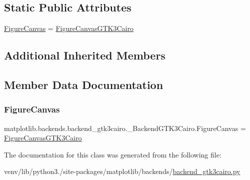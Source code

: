 \subsection*{Static Public Attributes}
\begin{DoxyCompactItemize}
\item 
\hyperlink{classmatplotlib_1_1backends_1_1backend__gtk3cairo_1_1__BackendGTK3Cairo_a6973d0943dc3c24234ed995259be9082}{Figure\+Canvas} = \hyperlink{classmatplotlib_1_1backends_1_1backend__gtk3cairo_1_1FigureCanvasGTK3Cairo}{Figure\+Canvas\+G\+T\+K3\+Cairo}
\end{DoxyCompactItemize}
\subsection*{Additional Inherited Members}


\subsection{Member Data Documentation}
\mbox{\label{classmatplotlib_1_1backends_1_1backend__gtk3cairo_1_1__BackendGTK3Cairo_a6973d0943dc3c24234ed995259be9082}} 
\subsubsection{\texorpdfstring{Figure\+Canvas}{FigureCanvas}}
{\footnotesize\ttfamily matplotlib.\+backends.\+backend\+\_\+gtk3cairo.\+\_\+\+Backend\+G\+T\+K3\+Cairo.\+Figure\+Canvas = \hyperlink{classmatplotlib_1_1backends_1_1backend__gtk3cairo_1_1FigureCanvasGTK3Cairo}{Figure\+Canvas\+G\+T\+K3\+Cairo}\hspace{0.3cm}{\ttfamily [static]}}



The documentation for this class was generated from the following file\+:\begin{DoxyCompactItemize}
\item 
venv/lib/python3./site-\/packages/matplotlib/backends/\hyperlink{backend__gtk3cairo_8py}{backend\+\_\+gtk3cairo.\+py}\end{DoxyCompactItemize}
